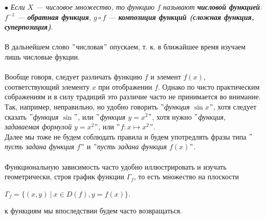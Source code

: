 $\bullet$ \textit{Если $X$ --- числовое множество, то функцию $f$ называют \textit{\textbf{числовой функцией}}. $f^{-1}$ --- \textit{\textbf{обратная функция}}, $g \circ f$ --- \textbf{\textit{композиция функций (сложная функция, суперпозиция)}}}.\\\\
В дальнейшем слово $"$числовая$"$ опускаем, т. к. в ближайшее время изучаем лишь числовые фукции.\\\\
Вообще говоря, следует различать функцию $f$ и элемент $f(x)$, соответствующий элементу $x$ при отображении $f$. Однако по чисто практическим сображениям и в силу традиций это различие часто не принимается во внимание.\\
Так, например, неправильно, но удобно говорить \textit{$"$функция $\sin{x}$$"$}, хотя следует сказать \textit{$"$функция $\sin$$"$}, или \textit{$"$функция $y=x^2$$"$}, хотя нужно \textit{$"$функция, задаваемая формулой $y=x^2$$"$}, или \textit{$"$$f : x \longmapsto x^2$$"$}.\\
Далее мы тоже не будем соблюдать правила и будем  употредлять фразы типа \textit{$"$пусть задана функция $f$$"$} и \textit{$"$пусть задана функция $f(x)$$"$.}\\\\
Функциональную зависимость часто удобно иллюстрировать и изучать геометрически, строя график функции $\Gamma_f$, то есть множество на плоскости
\begin{center}
	$\Gamma_f = \{(x,y) \:|\: x \in D(f), y=f(x)\}$.
\end{center}
к функциям мы впоследствии будем часто возвращаться.

